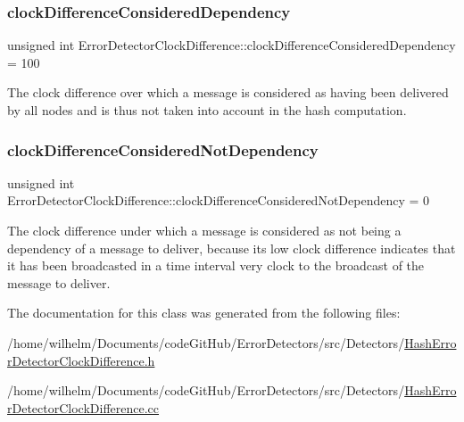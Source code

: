 \subsubsection{\texorpdfstring{clock\+Difference\+Considered\+Dependency}{clockDifferenceConsideredDependency}}
{\footnotesize\ttfamily unsigned int Error\+Detector\+Clock\+Difference\+::clock\+Difference\+Considered\+Dependency = 100\hspace{0.3cm}{\ttfamily [private]}}



The clock difference over which a message is considered as having been delivered by all nodes and is thus not taken into account in the hash computation. 

\mbox{\label{class_error_detector_clock_difference_aa733fc7d2023d62a7418ca20e01e9f5a}} 
\subsubsection{\texorpdfstring{clock\+Difference\+Considered\+Not\+Dependency}{clockDifferenceConsideredNotDependency}}
{\footnotesize\ttfamily unsigned int Error\+Detector\+Clock\+Difference\+::clock\+Difference\+Considered\+Not\+Dependency = 0\hspace{0.3cm}{\ttfamily [private]}}



The clock difference under which a message is considered as not being a dependency of a message to deliver, because its low clock difference indicates that it has been broadcasted in a time interval very clock to the broadcast of the message to deliver. 



The documentation for this class was generated from the following files\+:\begin{DoxyCompactItemize}
\item 
/home/wilhelm/\+Documents/code\+Git\+Hub/\+Error\+Detectors/src/\+Detectors/\hyperlink{_hash_error_detector_clock_difference_8h}{Hash\+Error\+Detector\+Clock\+Difference.\+h}\item 
/home/wilhelm/\+Documents/code\+Git\+Hub/\+Error\+Detectors/src/\+Detectors/\hyperlink{_hash_error_detector_clock_difference_8cc}{Hash\+Error\+Detector\+Clock\+Difference.\+cc}\end{DoxyCompactItemize}

